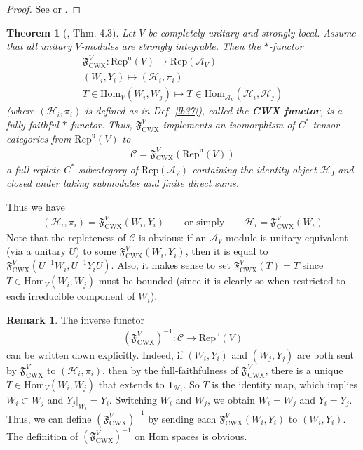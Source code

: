 \documentclass[11pt,b5paper,notitlepage]{article}
\theoremstyle{definition}
\newtheorem{rem}[df]{Remark}
\theoremstyle{plain}
\newtheorem{thm}[df]{Theorem}
\newcommand{\fk}{\mathfrak}
\newcommand{\mc}{\mathcal}
\newcommand{\idt}{\mathbf{1}}
\newcommand{\Hom}{\mathrm{Hom}}
\newcommand{\Rep}{\mathrm{Rep}}
\newcommand{\uni}{\mathrm{u}}
\newcommand{\scr}{\mathscr}
\newcommand{\RepV}{{\mathrm{Rep}^\uni(V)}}
\newcommand{\CWX}{{\scriptscriptstyle \mathrm{CWX}}}
\numberwithin{equation}{section}
\begin{document}
\begin{proof}
See \cite[Prop. 2.3.6]{Gui20} or \cite[Prop. 4.9]{Gui21a}.
\end{proof}

\begin{thm}[\cite{CWX}, \cite{Gui19b} Thm. 4.3]\label{lb42}
Let $V$ be completely unitary and strongly local. Assume that all unitary $V$-modules are strongly integrable. Then the $*$-functor 
\begin{gather*}
\fk F_\CWX^V:\RepV\rightarrow\Rep(\mc A_V)\\
(W_i,Y_i)\mapsto (\mc H_i,\pi_i)\\
T\in\Hom_V(W_i,W_j)\mapsto T\in\Hom_{\mc A_V}(\mc H_i, \mc H_j)
\end{gather*}
(where $(\mc H_i,\pi_i)$ is defined as in Def. \ref{lb37}), called the \textbf{CWX functor}, is a fully faithful $*$-functor. Thus, $\fk F_\CWX^V$ implements an isomorphism of $C^*$-tensor categories from $\RepV$ to 
\begin{align}
\scr C=\fk F_\CWX^V(\RepV)
\end{align}
a full replete $C^*$-subcategory of $\Rep(\mc A_V)$ containing the identity object $\mc H_0$ and closed under taking submodules and finite direct sums.
\end{thm}

Thus we have
\begin{align}
(\mc H_i,\pi_i)=\fk F_\CWX^V(W_i,Y_i)\qquad\text{or simply}\qquad \mc H_i=\fk F_\CWX^V(W_i)
\end{align}
Note that the repleteness of $\scr C$ is obvious: if an $\mc A_V$-module is unitary equivalent (via a unitary $U$) to some $\fk F_\CWX^V(W_i,Y_i)$, then it is equal to $\fk F_\CWX^V(U^{-1}W_i,U^{-1}Y_i U)$. Also, it makes sense to set $\fk F_\CWX^V(T)=T$ since $T\in\Hom_V(W_i,W_j)$ must be bounded (since it is clearly so when restricted to each irreducible component of $W_i$).




\begin{rem}
The inverse functor
\begin{align*}
(\fk F_\CWX^V)^{-1}:\scr C\rightarrow\RepV
\end{align*}
can be written down explicitly. Indeed, if $(W_i,Y_i)$ and $(W_j,Y_j)$ are both sent by $\fk F_\CWX^V$ to $(\mc H_i,\pi_i)$, then by the full-faithfulness of $\fk F_\CWX^V$, there is a unique $T\in\Hom_V(W_i,W_j)$ that extends to $\idt_{\mc H_i}$. So $T$ is the identity map, which implies $W_i\subset W_j$ and $Y_j|_{W_i}=Y_i$. Switching $W_i$ and $W_j$, we obtain $W_i=W_j$ and $Y_i=Y_j$. Thus, we can define $(\fk F_\CWX^V)^{-1}$ by sending each $\fk F_\CWX^V(W_i,Y_i)$ to $(W_i,Y_i)$. The definition of $(\fk F_\CWX^V)^{-1}$ on Hom spaces is obvious. 
\end{rem}
\end{document}
